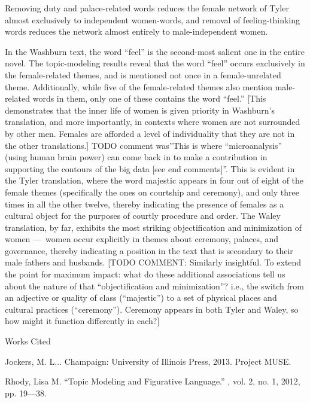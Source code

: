 \documentclass[12pt]{article}
\newcommand{\bibent}{\noindent \hangindent 40pt}
\newenvironment{workscited}{\newpage \begin{center} Works Cited \end{center}}{\newpage }
\begin{document}
\begin{flushleft}
\begin{spacing}{2.0}
Removing duty and palace-related words reduces the female network of Tyler almost exclusively to independent women-words, and removal of feeling-thinking words reduces the network almost entirely to male-independent women.


In the Washburn text, the word ``feel'' is the second-most salient one in the entire novel. The topic-modeling results reveal that the word ``feel'' occurs exclusively in the female-related themes, and is mentioned not once in a female-unrelated theme. Additionally, while five of the female-related themes also mention male-related words in them, only one of these contains the word ``feel.'' [This demonstrates that the inner life of women is given priority in Washburn's translation, and more importantly, in contexts where women are not surrounded by other men. Females are afforded a level of individuality that they are not in the other translations.] TODO comment was''This is where ``microanalysis'' (using human brain power) can come back in to make a contribution in supporting the contours of the big data [see end comments]''. This is evident in the Tyler translation, where the word majestic appears in four out of eight of the female themes (specifically the ones on courtship and ceremony), and only three times in all the other twelve, thereby indicating the presence of females as a cultural object for the purposes of courtly procedure and order. The Waley translation, by far, exhibits the most striking objectification and minimization of women --- women occur explicitly in themes about ceremony, palaces, and governance, thereby indicating a position in the text that is secondary to their male fathers and husbands. [TODO COMMENT: Similarly insightful. To extend the point for maximum impact: what do these additional associations tell us about the nature of that ``objectification and minimization''? i.e., the switch from an adjective or quality of class (``majestic'') to a set of physical places and cultural practices (``ceremony''). Ceremony appears in both Tyler and Waley, so how might it function differently in each?]

\begin{workscited}

\bibent Jockers, M. L... Champaign: University of Illinois Press, 2013. Project MUSE.

\bibent Rhody, Lisa M. ``Topic Modeling and Figurative Language.'' , vol. 2, no. 1, 2012, pp. 19---38.


\end{workscited}
\end{spacing}
\end{flushleft}
\end{document}

